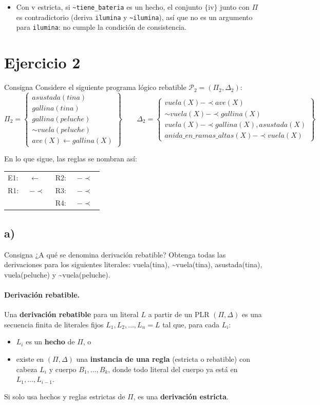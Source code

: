 \documentclass[11pt,a4paper]{article}
\makeatletter
\newcommand{\nf}{\textasciitilde}                 %
\newcommand{\reb}{\mathrel{-\!\!\!\prec}}         %
\newcommand{\est}{\leftarrow}                      %
\newcommand{\regla}[3]{\text{\texttt{#1}}~\ensuremath{#2}~\text{\texttt{#3}}}
\newcommand{\programaPdos}{%
\[
\Pi_2 = \left\{\begin{array}{l}
\mathit{asustada(tina)} \\
\mathit{gallina(tina)} \\
\mathit{gallina(peluche)} \\
\sim\mathit{vuela(peluche)} \\
\mathit{ave(X)} \est \mathit{gallina(X)}
\end{array}\right\}
\qquad
\Delta_2 = \left\{\begin{array}{l}
\mathit{vuela(X)} \reb \mathit{ave(X)} \\
\sim\mathit{vuela(X)} \reb \mathit{gallina(X)} \\
\mathit{vuela(X)} \reb \mathit{gallina(X), asustada(X)} \\
\mathit{anida\_en\_ramas\_altas(X)} \reb \mathit{vuela(X)}
\end{array}\right\}
\]}
\newcommand{\reglasPdos}{%
\begin{center}
\small
\begin{tabular}{@{}ll@{\qquad}ll@{}}
E1: & \regla{ave(X)}{\est}{gallina(X)} & R2: & \regla{\nf vuela(X)}{\reb}{gallina(X)} \\
R1: & \regla{vuela(X)}{\reb}{ave(X)} & R3: & \regla{vuela(X)}{\reb}{gallina(X), asustada(X)} \\
 & & R4: & \regla{anida\_en\_ramas\_altas(X)}{\reb}{vuela(X)} \\
\end{tabular}
\end{center}}
\makeatother
\begin{document}
\begin{extras}
\begin{itemize}
  \item Con v estricta, si \texttt{\nf tiene\_bateria} es un hecho, el conjunto $\{$iv$\}$ junto con $\Pi$ es contradictorio (deriva \texttt{ilumina} y \texttt{\nf ilumina}), así que no es un argumento para \texttt{ilumina}: no cumple la condición de consistencia.
\end{itemize}
\end{extras}

\section{Ejercicio 2}

\begin{enunciado}{Consigna}
Considere el siguiente programa lógico rebatible $\mathcal{P}_2 = (\Pi_2, \Delta_2)$:
\programaPdos
\end{enunciado}

En lo que sigue, las reglas se nombran así:
\reglasPdos

\subsection{a)}

\begin{enunciado}{Consigna}
¿A qué se denomina derivación rebatible? Obtenga todas las derivaciones para los siguientes literales: vuela(tina), \nf vuela(tina), asustada(tina), vuela(peluche) y \nf vuela(peluche).
\end{enunciado}

\paragraph{Derivación rebatible.} Una \textbf{derivación rebatible} para un literal $L$ a partir de un PLR $(\Pi, \Delta)$ es una secuencia finita de literales fijos $L_1, L_2, \dots, L_n = L$ tal que, para cada $L_i$:
\begin{itemize}
  \item $L_i$ es un \textbf{hecho} de $\Pi$, o
  \item existe en $(\Pi, \Delta)$ una \textbf{instancia de una regla} (estricta o rebatible) con cabeza $L_i$ y cuerpo $B_1, \dots, B_k$, donde todo literal del cuerpo ya está en $L_1, \dots, L_{i-1}$.
\end{itemize}
Si solo usa hechos y reglas estrictas de $\Pi$, es una \textbf{derivación estricta}.
\end{document}
